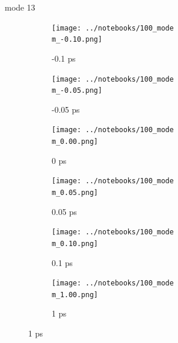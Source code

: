 \documentclass{beamer}
\begin{document}
\renewcommand\m{13}
\begin{frame}{mode \m}
	\begin{figure}
		\centering
		\begin{subfigure}[b]{\w\textwidth}
			\centering
			\texttt{[image: ../notebooks/100\_mode\\m\_-0.10.png]}
			\caption{-0.1 ps}
		\end{subfigure}
		\begin{subfigure}[b]{\w\textwidth}
			\centering
			\texttt{[image: ../notebooks/100\_mode\\m\_-0.05.png]}
			\caption{-0.05 ps}
		\end{subfigure}
		\begin{subfigure}[b]{\w\textwidth}
			\centering
			\texttt{[image: ../notebooks/100\_mode\\m\_0.00.png]}
			\caption{0 ps}
		\end{subfigure}
		\begin{subfigure}[b]{\w\textwidth}
			\centering
			\texttt{[image: ../notebooks/100\_mode\\m\_0.05.png]}
			\caption{0.05 ps}
		\end{subfigure}
		\begin{subfigure}[b]{\w\textwidth}
			\centering
			\texttt{[image: ../notebooks/100\_mode\\m\_0.10.png]}
			\caption{0.1 ps}
		\end{subfigure}
		\begin{subfigure}[b]{\w\textwidth}
			\centering
			\texttt{[image: ../notebooks/100\_mode\\m\_1.00.png]}
			\caption{1 ps}
		\end{subfigure}
	\end{figure}
\end{frame}
\end{document}
